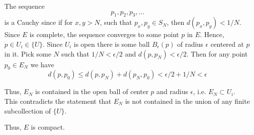 \documentclass[12pt]{article}
\begin{document}
\begin{solution}
\begin{enumerate}
        The sequence \[p_1, p_2, p_3, \ldots\] is a Cauchy since if for $x, y > N$, such that $p_x, p_y \in S_N$, then $d(p_x, p_y) < 1/N$. Since $E$ is complete, the sequence converges to some point $p$ in $E$. Hence, $p \in U_i \in \{U\}$. Since $U_i$ is open there is some ball $B_\epsilon(p)$ of radius $\epsilon$ centered at $p$ in it. Pick some $N$ such that $1/N < \epsilon/2$ and $d(p, p_N) < \epsilon /2$. Then for any point $p_0 \in E_N$ we have 
        \[d(p, p_0) \leq d(p, p_N) + d(p_N, p_0) < \epsilon/2 + 1/N < \epsilon\]

        Thus, $E_N$ is contained in the open ball of center $p$ and radius $\epsilon$, i.e. $E_N \subset U_i$. This contradicts the statement that $E_N$ is not contained in the union of any finite subcollection of $\{U\}$. 

        Thus, $E$ is compact.
    \end{enumerate}
\end{solution}
\end{document}
